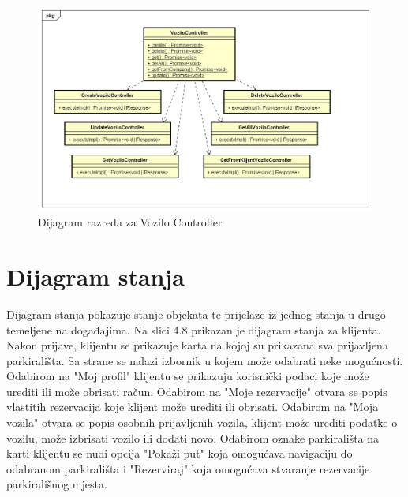 			\begin{figure}[H]
			\includegraphics[width=1\linewidth]{dijagrami/Dijagram razreda - VoziloController.png}
			\caption{Dijagram razreda za Vozilo Controller}
			\label{fig:Dijagram razreda - VoziloController} 
		\end{figure}
			
			
			\eject
		
		\section{Dijagram stanja}
			
			Dijagram stanja pokazuje stanje objekata te prijelaze iz jednog stanja u drugo temeljene na događajima. Na slici 4.8 prikazan je dijagram stanja za klijenta. Nakon prijave, klijentu se prikazuje karta na kojoj su prikazana sva prijavljena parkirališta. Sa strane se nalazi izbornik u kojem može odabrati neke mogućnosti. Odabirom na "Moj profil" klijentu se prikazuju korisnički podaci koje može urediti ili može obrisati račun. Odabirom na "Moje rezervacije" otvara se popis vlastitih rezervacija koje klijent može urediti ili obrisati. Odabirom na "Moja vozila" otvara se popis osobnih prijavljenih vozila, klijent može urediti podatke o vozilu, može izbrisati vozilo ili dodati novo. Odabirom oznake parkirališta na karti klijentu se nudi opcija "Pokaži put" koja omogućava navigaciju do odabranom parkirališta i "Rezerviraj" koja omogućava stvaranje rezervacije parkirališnog mjesta.
			
